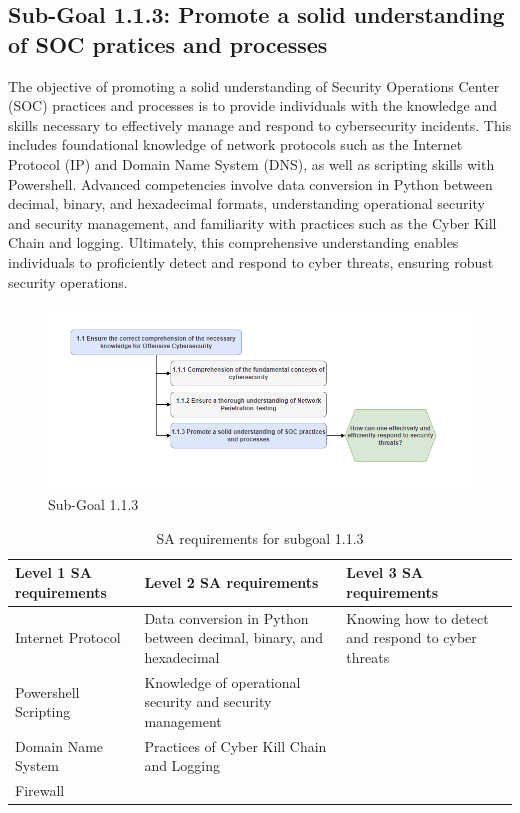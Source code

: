 \newpage
\subsection{Sub-Goal 1.1.3: Promote a solid understanding of SOC pratices and processes}
The objective of promoting a solid understanding of Security Operations Center (SOC) practices and processes is to provide individuals with the knowledge and skills necessary to effectively manage and respond to cybersecurity incidents. This includes foundational knowledge of network protocols such as the Internet Protocol (IP) and Domain Name System (DNS), as well as scripting skills with Powershell. Advanced competencies involve data conversion in Python between decimal, binary, and hexadecimal formats, understanding operational security and security management, and familiarity with practices such as the Cyber Kill Chain and logging. Ultimately, this comprehensive understanding enables individuals to proficiently detect and respond to cyber threats, ensuring robust security operations.

\begin{figure}[H]
    \centering
    \includegraphics[width=\textwidth]{./assets/subgoal_1.1.3.png}
    \caption{Sub-Goal 1.1.3}
    \label{fig:subgoal1.1.3}
\end{figure}

\begin{table}[H]
\begin{center}
\begin{tabular}{ | m{5cm} | m{5cm}| m{5cm} | } 
  \hline
  \textbf{Level 1 SA requirements} & \textbf{Level 2 SA requirements}  & \textbf{Level 3 SA requirements}  \\ 
  \hline
  Internet Protocol & Data conversion in Python between decimal, binary, and hexadecimal & Knowing how to detect and respond to cyber threats\\ 
  \hline
  Powershell Scripting & Knowledge of operational security and security management & \\ 
  \hline
  Domain Name System & Practices of Cyber Kill Chain and Logging & \\ 
  \hline
  Firewall &  & \\ 
  \hline
\end{tabular}
\end{center}
\caption{SA requirements for subgoal 1.1.3}
\end{table}

